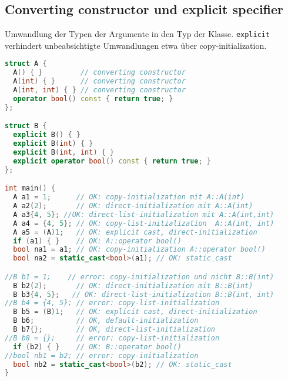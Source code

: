 \subsection{Converting constructor und explicit specifier}

Umwandlung der Typen der Argumente in den Typ der Klasse. \lstinline|explicit|
verhindert unbeabsichtigte Umwandlungen etwa über copy-initialization.

\begin{lstlisting}[language=C++]
struct A {
  A() { }         // converting constructor
  A(int) { }      // converting constructor
  A(int, int) { } // converting constructor
  operator bool() const { return true; }
};

struct B {
  explicit B() { }
  explicit B(int) { }
  explicit B(int, int) { }
  explicit operator bool() const { return true; }
};

int main() {
  A a1 = 1;      // OK: copy-initialization mit A::A(int)
  A a2(2);       // OK: direct-initialization mit A::A(int)
  A a3{4, 5}; //OK: direct-list-initialization mit A::A(int,int)
  A a4 = {4, 5}; // OK: copy-list-initialization  A::A(int, int)
  A a5 = (A)1;   // OK: explicit cast, direct-initialization
  if (a1) { }    // OK: A::operator bool()
  bool na1 = a1; // OK: copy-initialization A::operator bool()
  bool na2 = static_cast<bool>(a1); // OK: static_cast

//B b1 = 1;    // error: copy-initialization und nicht B::B(int)
  B b2(2);       // OK: direct-initialization mit B::B(int)
  B b3{4, 5};   // OK: direct-list-initialization B::B(int, int)
//B b4 = {4, 5}; // error: copy-list-initialization
  B b5 = (B)1;   // OK: explicit cast, direct-initialization
  B b6;          // OK, default-initialization
  B b7{};        // OK, direct-list-initialization
//B b8 = {};     // error: copy-list-initialization
  if (b2) { }    // OK: B::operator bool()
//bool nb1 = b2; // error: copy-initialization
  bool nb2 = static_cast<bool>(b2); // OK: static_cast
}
\end{lstlisting}